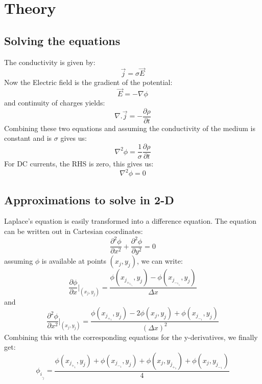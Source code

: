 \documentclass[11pt]{article}
\begin{document}
\section{Theory}

\subsection{Solving the equations}
The conductivity is given by:
\begin{equation}
    \Vec{\textit{j}}= \sigma\Vec{\textit{E}}
\end{equation}
Now the Electric field is the gradient of the potential:
\begin{equation}
    \Vec{\textit{E}}= -\nabla\phi
\end{equation}
and continuity of charges yields:
\begin{equation}
    \nabla.\Vec{\textit{j}}=- \frac{\partial \rho}{\partial t} 
\end{equation}
Combining these two equations and assuming the conductivity of the medium is constant and is $\sigma$ gives us:
\begin{equation}
    \nabla^2\phi= \frac{1}{\sigma} \frac{\partial \rho}{\partial t} 
\end{equation}
For DC currents, the RHS is zero, this gives us:
\begin{equation}
    \nabla^2\phi= 0
\end{equation}

\subsection{Approximations to solve in 2-D}
Laplace’s equation is easily transformed into a difference equation. The equation can be written out in Cartesian coordinates:
\begin{equation}
    \frac{\partial^2 \phi}{\partial x^2} + \frac{\partial^2 \phi}{\partial y^2} = 0
\end{equation}
assuming $\phi$ is available at points $(x_j,y_j)$, we can write:
\begin{equation}
    \frac{\partial \phi}{\partial x} \Biggr|_{(x_j,y_j)}^{} = \frac{\phi(x_j_+_1_/_2,y_j) - \phi(x_j_-_1_/_2,y_j)}{\Delta x}
\end{equation}
and
\begin{equation}
    \frac{\partial^2 \phi}{\partial x^2} \Biggr|_{(x_j,y_j)}^{} = \frac{\phi(x_j_+_1,y_j) - 2\phi(x_j,y_j) + \phi(x_j_-_1,y_j)}{(\Delta x)^2}
\end{equation}
Combining this with the corresponding equations for the y-derivatives, we finally get:
\begin{equation}
    \phi_i_,_j = \frac{\phi(x_j_+_1,y_j) +\phi(x_j_-_1,y_j) +\phi(x_j,y_j_+_1) +\phi(x_j,y_j_-_1) }{4}
\end{equation}
\end{document}
